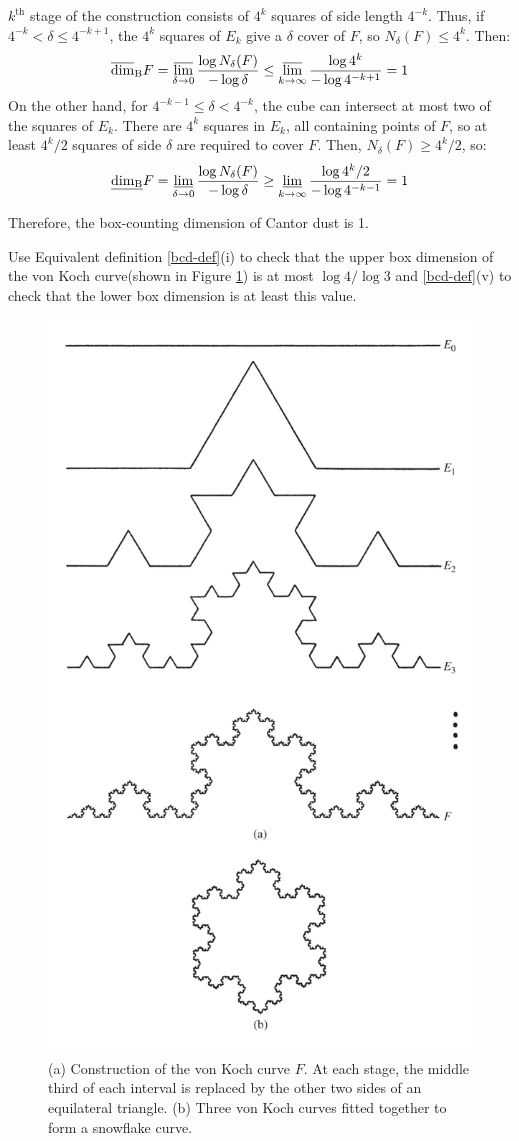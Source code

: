 \begin{customsol}{2.4}
    $k^{\text{th}}$ stage of the construction consists of $4^k$ squares of side length $4^{-k}$. Thus, if $4^{-k} < \delta \leq 4^{-k+1}$, the $4^k$ squares of $E_k$ give a $\delta$ cover of $F$, so $N_\delta(F)\leq 4^k$. Then:
    $$
    \overline{\operatorname{dim}}_{\mathrm{B}} F = \operatorname*{\overline{lim}}_{\delta\rightarrow 0} \frac{\log N_\delta(F)}{-\log \delta}\leq \operatorname*{\overline{lim}}_{k\rightarrow\infty} \frac{\log 4^k}{-\log 4^{-k+1}} = 1
    $$
    On the other hand, for $4^{-k-1}\leq \delta < 4^{-k}$, the cube can intersect at most two of the squares of $E_k$. There are $4^k$ squares in $E_k$, all containing points of $F$, so at least $4^k/2$ squares of side $\delta$ are required to cover $F$. Then, $N_\delta (F) \geq 4^{k}/2$, so:
    $$
    \underline{\operatorname{dim}_{\mathrm{B}}} F = \operatorname*{\underline{lim}}_{\delta\rightarrow 0}\frac{\log N_\delta(F)}{-\log \delta} \geq \operatorname*{\underline{lim}}_{k\rightarrow\infty} \frac{\log 4^k/2}{-\log 4^{-k-1}} = 1
    $$

    Therefore, the box-counting dimension of Cantor dust is 1. 
\end{customsol}



\begin{customexercise}{2.5}
    Use Equivalent definition \ref{bcd-def}(i) to check that the upper box dimension of the von Koch curve(shown in Figure \ref{fig:kochcurve}) is at most $\log 4 / \log 3$ and \ref{bcd-def}(v) to check that the lower box dimension is at least this value.
    \begin{figure}[t]
        \centering
        \includegraphics[width=.4\textwidth]{images/Kochcurve.png}
        \caption{(a) Construction of the von Koch curve $F$. At each stage, the middle third of each interval is replaced by the other two sides of an equilateral triangle. (b) Three von Koch curves fitted together to form a snowflake curve.}
        \label{fig:kochcurve}
    \end{figure}
\end{customexercise}

